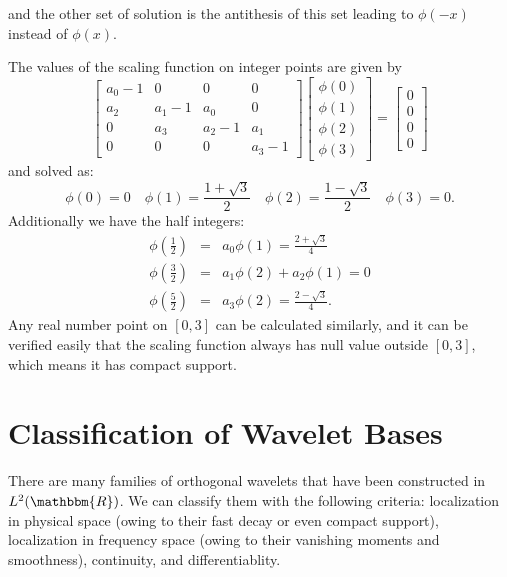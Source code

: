 \documentclass{book}
\begin{document}
and the other set of solution is the antithesis of this set leading to $\phi
(- x)$ instead of $\phi (x)$.

The values of the scaling function on integer points are given by
\[ \left[\begin{array}{cccc}
     a_0 - 1 & 0 & 0 & 0\\
     a_2 & a_1 - 1 & a_0 & 0\\
     0 & a_3 & a_2 - 1 & a_1\\
     0 & 0 & 0 & a_3 - 1
   \end{array}\right] \left[\begin{array}{c}
     \phi (0)\\
     \phi (1)\\
     \phi (2)\\
     \phi (3)
   \end{array}\right] = \left[\begin{array}{c}
     0\\
     0\\
     0\\
     0
   \end{array}\right] \]
and solved as:
\[ \phi (0) = 0 \quad \phi (1) = \frac{1 + \sqrt{3}}{2} \quad \phi (2) =
   \frac{1 - \sqrt{3}}{2} \quad \phi (3) = 0. \]
Additionally we have the half integers:
\begin{eqnarray*}
  \phi \left( \frac{1}{2} \right) & = & a_0 \phi (1) = \frac{2 +
  \sqrt{3}}{4}\\
  \phi \left( \frac{3}{2} \right) & = & a_1 \phi (2) + a_2 \phi (1) = 0\\
  \phi \left( \frac{5}{2} \right) & = & a_3 \phi (2) = \frac{2 - \sqrt{3}}{4}
  .
\end{eqnarray*}
Any real number point on $[0, 3]$ can be calculated similarly, and it can be
verified easily that the scaling function always has null value outside $[0,
3]$, which means it has compact support.

\section{Classification of Wavelet Bases}

There are many families of orthogonal wavelets that have been constructed in
$L^2 (\mathbbm{R})$. We can classify them with the following criteria:
localization in physical space (owing to their fast decay or even compact
support{\cite{schneider2010wavelet}}), localization in frequency space (owing
to their vanishing moments and smoothness{\cite{schneider2010wavelet}}),
continuity, and differentiablity.
\end{document}
